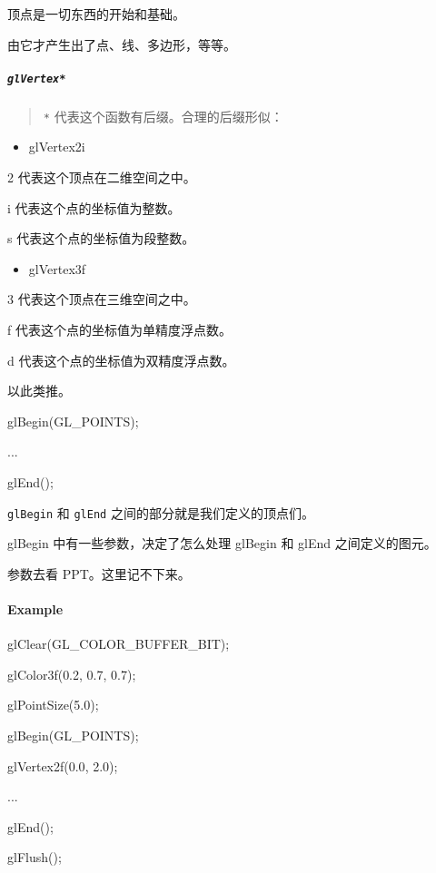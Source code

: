 \documentclass[
]{article}
\newenvironment{Shaded}{}{}
\newcommand{\FloatTok}[1]{\textcolor[rgb]{0.25,0.63,0.44}{#1}}
\newcommand{\NormalTok}[1]{#1}
\begin{document}
顶点是一切东西的开始和基础。

由它才产生出了点、线、多边形，等等。

\hypertarget{header-n161}{%
\subparagraph{\texorpdfstring{\texttt{glVertex*}}{glVertex*}}\label{header-n161}}

\begin{quote}
\texttt{*} 代表这个函数有后缀。合理的后缀形似：
\end{quote}

\begin{itemize}
\item
  glVertex2i
\end{itemize}

2 代表这个顶点在二维空间之中。

i 代表这个点的坐标值为整数。

s 代表这个点的坐标值为段整数。

\begin{itemize}
\item
  glVertex3f
\end{itemize}

3 代表这个顶点在三维空间之中。

f 代表这个点的坐标值为单精度浮点数。

d 代表这个点的坐标值为双精度浮点数。

以此类推。

\begin{Shaded}
\begin{Highlighting}[]
\NormalTok{glBegin(GL_POINTS);}

\NormalTok{...}

\NormalTok{glEnd();}
\end{Highlighting}
\end{Shaded}

\texttt{glBegin} 和 \texttt{glEnd} 之间的部分就是我们定义的顶点们。

glBegin 中有一些参数，决定了怎么处理 glBegin 和 glEnd 之间定义的图元。

参数去看 PPT。这里记不下来。

\hypertarget{header-n181}{%
\paragraph{Example}\label{header-n181}}

\begin{Shaded}
\begin{Highlighting}[]

\NormalTok{glClear(GL_COLOR_BUFFER_BIT);}

\NormalTok{glColor3f(}\FloatTok{0.2}\NormalTok{, }\FloatTok{0.7}\NormalTok{, }\FloatTok{0.7}\NormalTok{);}

\NormalTok{glPointSize(}\FloatTok{5.0}\NormalTok{);}

\NormalTok{glBegin(GL_POINTS);}

\NormalTok{glVertex2f(}\FloatTok{0.0}\NormalTok{, }\FloatTok{2.0}\NormalTok{);}

\NormalTok{...}

\NormalTok{glEnd();}

\NormalTok{glFlush();}
\end{Highlighting}
\end{Shaded}
\end{document}

